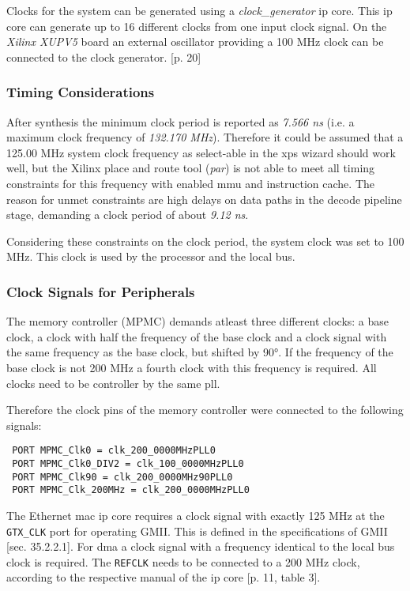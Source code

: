 Clocks for the system can be generated using a \textit{clock\_generator} \gls{ip} core. This \gls{ip} core can generate up to 16 different clocks from one input clock signal. On the \textit{Xilinx XUPV5} board an external oscillator providing a 100 MHz clock can be connected to the clock generator. \cite{ug347}[p. 20]

\subsubsection{Timing Considerations}

After synthesis the minimum clock period is reported as \textit{7.566 ns} (i.e. a maximum clock frequency of \textit{132.170 MHz}). Therefore it could be assumed that a 125.00 MHz system clock frequency as select-able in the \gls{xps} wizard should work well, but the Xilinx place and route tool (\textit{par}) is not able to meet all timing constraints for this frequency with enabled \gls{mmu} and instruction cache. The reason for unmet constraints are high delays on data paths in the decode pipeline stage, demanding a clock period of about \textit{9.12 ns}.

Considering these constraints on the clock period, the system clock was set to 100 MHz. This clock is used by the processor and the local bus.

\subsubsection{Clock Signals for Peripherals}

The memory controller (MPMC) demands atleast three different clocks: a base clock, a clock with half the frequency of the base clock and a clock signal with the same frequency as the base clock, but shifted by 90°. If the frequency of the base clock is not 200 MHz a fourth clock with this frequency is required. All clocks need to be controller by the same \gls{pll}.

Therefore the clock pins of the memory controller were connected to the following signals:

\begin{verbatim}
 PORT MPMC_Clk0 = clk_200_0000MHzPLL0
 PORT MPMC_Clk0_DIV2 = clk_100_0000MHzPLL0
 PORT MPMC_Clk90 = clk_200_0000MHz90PLL0
 PORT MPMC_Clk_200MHz = clk_200_0000MHzPLL0
\end{verbatim}

The Ethernet \gls{mac} \gls{ip} core requires a clock signal with exactly 125 MHz at the \texttt{GTX\_CLK} port for operating GMII. This is defined in the specifications of GMII \cite{ieee802_3}[sec. 35.2.2.1]. For \gls{dma} a clock signal with a frequency identical to the local bus clock is required. The \texttt{REFCLK} needs to be connected to a 200 MHz clock, according to the respective manual of the \gls{ip} core \cite{xps_ll_temac}[p. 11, table 3].

